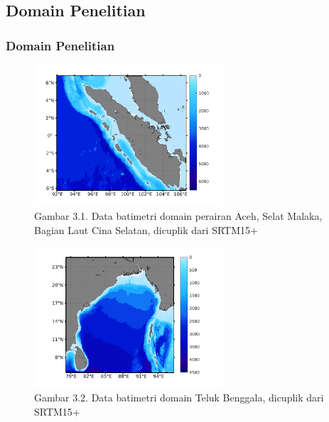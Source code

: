 \documentclass{beamer}
\begin{document}
\subsection{Domain Penelitian}
\begin{frame}[allowframebreaks]
	\frametitle{Domain Penelitian}
	\begin{figure}[H]
		\centering
		\includegraphics[width=7cm]{Topo_1}
		\captionsetup{labelformat=empty}
		\caption{Gambar 3.1. Data batimetri domain perairan Aceh, Selat Malaka, Bagian Laut Cina Selatan, dicuplik dari SRTM15+}
		\label{fig:domain}
	\end{figure}
	\begin{figure}[H]
		\centering
		\includegraphics[width=7cm]{Topo_2}
		\captionsetup{labelformat=empty}
		\caption{Gambar 3.2. Data batimetri domain Teluk Benggala, dicuplik dari SRTM15+}
		\label{fig:domain_1}
	\end{figure}
\end{frame}
\end{document}
